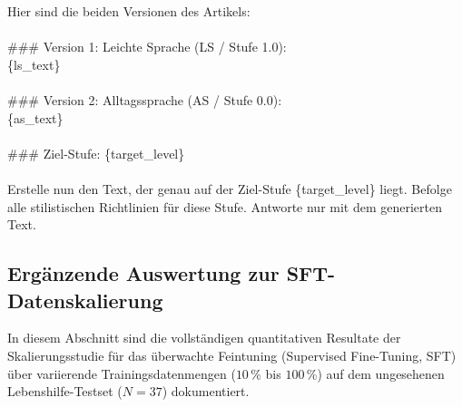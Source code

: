 \begin{tcolorbox}[colback=gray!5!white,colframe=gray!60!black,title=\textbf{User-Prompt-Template: Übergabe der Artikelpaare},sharp corners,boxrule=0.8pt]
\small\ttfamily
Hier sind die beiden Versionen des Artikels:\\
\\
\#\#\# Version 1: Leichte Sprache (LS / Stufe 1.0):\\
\{ls\_text\}\\
\\
\#\#\# Version 2: Alltagssprache (AS / Stufe 0.0):\\
\{as\_text\}\\
\\
\#\#\# Ziel-Stufe: \{target\_level\}\\
\\
Erstelle nun den Text, der genau auf der Ziel-Stufe \{target\_level\} liegt. Befolge alle stilistischen Richtlinien für diese Stufe. Antworte nur mit dem generierten Text.
\end{tcolorbox}

\subsection{Ergänzende Auswertung zur SFT-Datenskalierung}
\label{sec:anhang_sft_scaling}

In diesem Abschnitt sind die vollständigen quantitativen Resultate der Skalierungsstudie für das überwachte Feintuning (Supervised Fine-Tuning, SFT) über variierende Trainingsdatenmengen ($10\,\%$ bis $100\,\%$) auf dem ungesehenen Lebenshilfe-Testset ($N=37$) dokumentiert.


